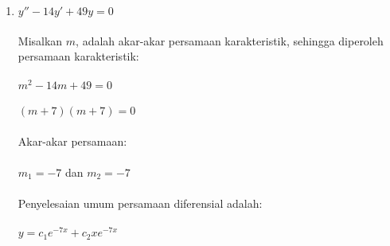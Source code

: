 \begin{enumerate}[1.]
	\item  \begin{math} y''- 14y' + 49y = 0 \end{math} \\ \\
	Misalkan \begin{math} m \end{math}, adalah akar-akar persamaan karakteristik, sehingga diperoleh persamaan karakteristik: \\ \\
	\begin{math} m^{2} - 14m + 49 = 0 \end{math} \\ \\
	\begin{math} (m + 7)(m + 7) = 0 \end{math} \\ \\
	Akar-akar persamaan: \\ \\
	\begin{math} m_1 = -7 \end{math} dan \begin{math} m_2 = -7 \end{math} \\ \\
	Penyelesaian umum persamaan diferensial adalah: \\ \\
	\begin{math} y = c_1 e^{-7x} + c_2 xe^{-7x} \end{math}


\end{enumerate}
